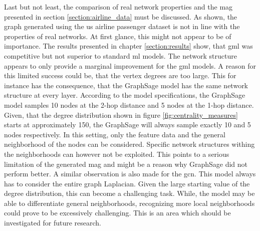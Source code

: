   \noindent Last but not least, the comparison of real network properties and
  the \acs{mag} presented in section \ref{section:airline_data} must be
  discussed. As shown, the graph generated using the \acs{us} airline passenger
  dataset is not in line with the properties of real networks. At first glance,
  this might not appear to be of importance. The results presented in chapter
  \ref{section:results} show, that \acs{gml} was competitive but not superior
  to standard \acs{ml} models. The network structure appears to only provide a
  marginal improvement for the \acs{gml} models. A reason for this limited
  success could be, that the vertex degrees are too large. This for instance has
  the consequence, that the GraphSage model has the same network structure at
  every layer. According to the model specifications, the GraphSage model
  samples 10 nodes at the 2-hop distance and 5 nodes at the 1-hop distance.
  Given, that the degree distribution shown in figure
  \ref{fig:centrality_measures} starts at approximately 150, the GraphSage will
  always sample exactly 10 and 5 nodes respectively. In this setting, only the 
  feature data and the general neighborhood of the nodes can be considered.
  Specific network structures withing the neighborhoods can however not be
  exploited. This points to a serious limitation of the generated \acs{mag} 
  and might be a reason why GraphSage did not perform better. A similar
  observation is also made for the \acs{gcn}. This model always has to consider
  the entire graph Laplacian. Given the large starting value of the degree
  distribution, this can become a challenging task. While, the model may be
  able to differentiate general neighborhoods, recognizing more local
  neighborhoods could prove to be excessively challenging. This is an area which
  should be investigated for future research.






